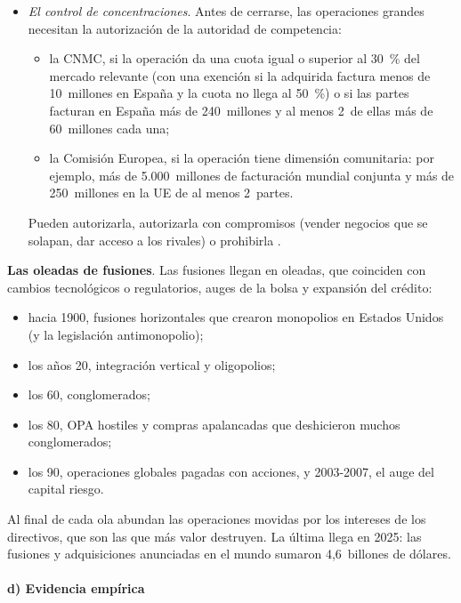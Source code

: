 \documentclass[11pt]{article}
\begin{document}
\begin{itemize}
\item \emph{El control de concentraciones}. Antes de cerrarse, las operaciones grandes necesitan la autorización de la autoridad de competencia:
  \begin{itemize}
  \item la CNMC, si la operación da una cuota igual o superior al 30~\% del mercado relevante (con una exención si la adquirida factura menos de 10~millones en España y la cuota no llega al 50~\%) o si las partes facturan en España más de 240~millones y al menos 2~de ellas más de 60~millones cada una\nocite{BOE2007LDC};
  \item la Comisión Europea, si la operación tiene dimensión comunitaria: por ejemplo, más de 5.000~millones de facturación mundial conjunta y más de 250~millones en la UE de al menos 2~partes\nocite{UE2004Reglamento139}.
  \end{itemize}
  Pueden autorizarla, autorizarla con compromisos (vender negocios que se solapan, dar acceso a los rivales) o prohibirla  .
\end{itemize}

\begin{anotaciones}
\textbf{Las oleadas de fusiones}. Las fusiones llegan en oleadas, que coinciden con cambios tecnológicos o regulatorios, auges de la bolsa y expansión del crédito\nocite{MartynovaRenneboog2008Century}:
\begin{itemize}
\item hacia 1900, fusiones horizontales que crearon monopolios en Estados Unidos (y la legislación antimonopolio);
\item los años 20, integración vertical y oligopolios;
\item los 60, conglomerados;
\item los 80, OPA hostiles y compras apalancadas que deshicieron muchos conglomerados;
\item los 90, operaciones globales pagadas con acciones, y 2003-2007, el auge del capital riesgo.
\end{itemize}
Al final de cada ola abundan las operaciones movidas por los intereses de los directivos, que son las que más valor destruyen. La última llega en 2025: las fusiones y adquisiciones anunciadas en el mundo sumaron 4,6~billones de dólares\nocite{LSEG2026MA}.
\end{anotaciones}

\paragraph{d) Evidencia empírica}
\end{document}
